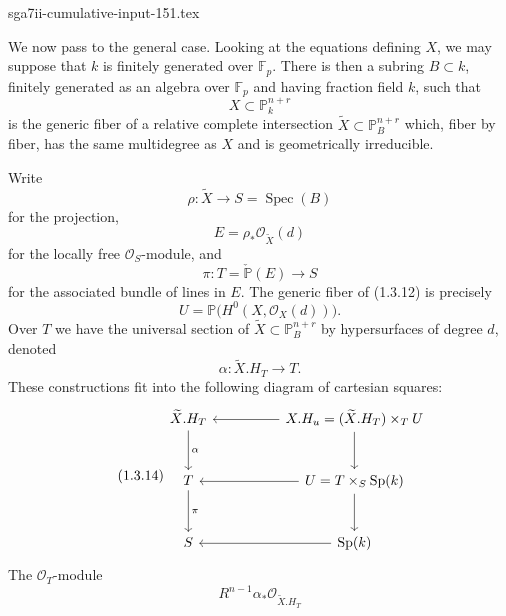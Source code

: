 \begin{filecontents*}{sga7ii-cumulative-input-151.tex}
\par\medskip
We now pass to the general case.  Looking at the equations defining $X$, we
may suppose that $k$ is finitely generated over $\mathbb F_p$.  There is
then a subring $B\subset k$, finitely generated as an algebra over
$\mathbb F_p$ and having fraction field $k$, such that
\begin{equation}\tag{1.3.9}
X\subset\mathbb P_k^{n+r}
\end{equation}
is the generic fiber of a relative complete intersection
$\widetilde X\subset\mathbb P_B^{n+r}$ which, fiber by fiber, has the same
multidegree as $X$ and is geometrically irreducible.

Write
\begin{equation}\tag{1.3.10}
\rho:\widetilde X\longrightarrow S=\operatorname{Spec}(B)
\end{equation}
for the projection,
\begin{equation}\tag{1.3.11}
E=\rho_*\mathcal O_{\widetilde X}(d)
\end{equation}
for the locally free $\mathcal O_S$-module, and
\begin{equation}\tag{1.3.12}
\pi:T=\check{\mathbb P}(E)\longrightarrow S
\end{equation}
for the associated bundle of lines in $E$.  The generic fiber of (1.3.12)
is precisely
\[
U=\mathbb P\bigl(H^0(X,\mathcal O_X(d))\bigr).
\]
Over $T$ we have the universal section of
$\widetilde X\subset\mathbb P_B^{n+r}$ by hypersurfaces of degree $d$,
denoted
\begin{equation}\tag{1.3.13}
\alpha:\widetilde X.H_T\longrightarrow T.
\end{equation}
These constructions fit into the following diagram of cartesian squares:
\begin{equation}\tag{1.3.14}
\begin{tikzcd}[column sep=huge,row sep=large]
\widetilde X.H_T \arrow[d,"\alpha"]
  & X.H_u=(\widetilde X.H_T)\times_T U \arrow[l]\arrow[d] \\
T \arrow[d,"\pi"]
  & U=T\times_S\operatorname{Sp}(k) \arrow[l]\arrow[d] \\
S & \operatorname{Sp}(k)\arrow[l]
\end{tikzcd}
\end{equation}
The $\mathcal O_T$-module
\begin{equation}\tag{1.3.15}
R^{n-1}\alpha_*\mathcal O_{\widetilde X.H_T}
\end{equation}

\end{filecontents*}
